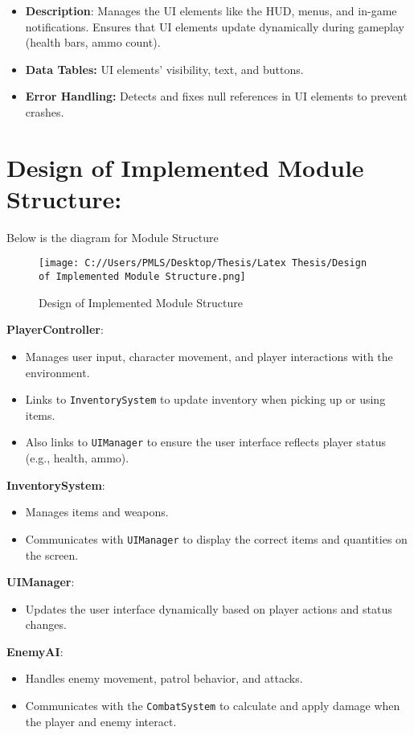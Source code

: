 \begin{itemize}
	\item \textbf{Description}: Manages the UI elements like the HUD, menus, and in-game notifications. Ensures that UI elements update dynamically during gameplay (health bars, ammo count).
	\item \textbf{Data Tables:} UI elements’ visibility, text, and buttons.
	\item \textbf{Error Handling:} Detects and fixes null references in UI elements to prevent crashes.
\end{itemize}

\section{Design of Implemented Module Structure:}
Below is the diagram for Module Structure
\begin{figure}[H]
	\centering
	\texttt{[image: C://Users/PMLS/Desktop/Thesis/Latex Thesis/Design of Implemented Module Structure.png]}
	\caption{Design of Implemented Module Structure}
	\label{fig:Design of Implemented Module Structure}
\end{figure}
\textbf{PlayerController}:
\begin{itemize}
	\item Manages user input, character movement, and player interactions with the environment.
	\item Links to \texttt{InventorySystem} to update inventory when picking up or using items.
	\item Also links to \texttt{UIManager} to ensure the user interface reflects player status (e.g., health, ammo).
\end{itemize}

\textbf{InventorySystem}:
\begin{itemize}
	\item Manages items and weapons.
	\item Communicates with \texttt{UIManager} to display the correct items and quantities on the screen.
\end{itemize}

\textbf{UIManager}:
\begin{itemize}
	\item Updates the user interface dynamically based on player actions and status changes.
\end{itemize}

\textbf{EnemyAI}:
\begin{itemize}
	\item Handles enemy movement, patrol behavior, and attacks.
	\item Communicates with the \texttt{CombatSystem} to calculate and apply damage when the player and enemy interact.
\end{itemize}

